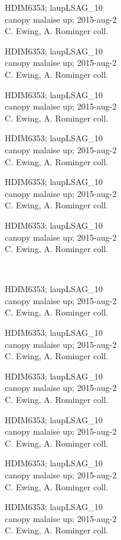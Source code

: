 \documentclass[2pt]{extarticle}
\begin{document}
\noindent
\parbox{0.16\textwidth}{\tiny \raggedright \rule[-0.3\baselineskip]{0pt}{10pt}HDIM6353; laupLSAG\_10\\ canopy malaise up; 2015-aug-2\\ C. Ewing, A. Rominger coll.}
\parbox{0.16\textwidth}{\tiny \raggedright \rule[-0.3\baselineskip]{0pt}{10pt}HDIM6353; laupLSAG\_10\\ canopy malaise up; 2015-aug-2\\ C. Ewing, A. Rominger coll.}
\parbox{0.16\textwidth}{\tiny \raggedright \rule[-0.3\baselineskip]{0pt}{10pt}HDIM6353; laupLSAG\_10\\ canopy malaise up; 2015-aug-2\\ C. Ewing, A. Rominger coll.}
\parbox{0.16\textwidth}{\tiny \raggedright \rule[-0.3\baselineskip]{0pt}{10pt}HDIM6353; laupLSAG\_10\\ canopy malaise up; 2015-aug-2\\ C. Ewing, A. Rominger coll.}
\parbox{0.16\textwidth}{\tiny \raggedright \rule[-0.3\baselineskip]{0pt}{10pt}HDIM6353; laupLSAG\_10\\ canopy malaise up; 2015-aug-2\\ C. Ewing, A. Rominger coll.}
\parbox{0.16\textwidth}{\tiny \raggedright \rule[-0.3\baselineskip]{0pt}{10pt}HDIM6353; laupLSAG\_10\\ canopy malaise up; 2015-aug-2\\ C. Ewing, A. Rominger coll.} \\ 
\vspace{0.001in} 

\noindent
\parbox{0.16\textwidth}{\tiny \raggedright \rule[-0.3\baselineskip]{0pt}{10pt}HDIM6353; laupLSAG\_10\\ canopy malaise up; 2015-aug-2\\ C. Ewing, A. Rominger coll.}
\parbox{0.16\textwidth}{\tiny \raggedright \rule[-0.3\baselineskip]{0pt}{10pt}HDIM6353; laupLSAG\_10\\ canopy malaise up; 2015-aug-2\\ C. Ewing, A. Rominger coll.}
\parbox{0.16\textwidth}{\tiny \raggedright \rule[-0.3\baselineskip]{0pt}{10pt}HDIM6353; laupLSAG\_10\\ canopy malaise up; 2015-aug-2\\ C. Ewing, A. Rominger coll.}
\parbox{0.16\textwidth}{\tiny \raggedright \rule[-0.3\baselineskip]{0pt}{10pt}HDIM6353; laupLSAG\_10\\ canopy malaise up; 2015-aug-2\\ C. Ewing, A. Rominger coll.}
\parbox{0.16\textwidth}{\tiny \raggedright \rule[-0.3\baselineskip]{0pt}{10pt}HDIM6353; laupLSAG\_10\\ canopy malaise up; 2015-aug-2\\ C. Ewing, A. Rominger coll.}
\parbox{0.16\textwidth}{\tiny \raggedright \rule[-0.3\baselineskip]{0pt}{10pt}HDIM6353; laupLSAG\_10\\ canopy malaise up; 2015-aug-2\\ C. Ewing, A. Rominger coll.} \\ 
\vspace{0.001in} 
\end{document}
